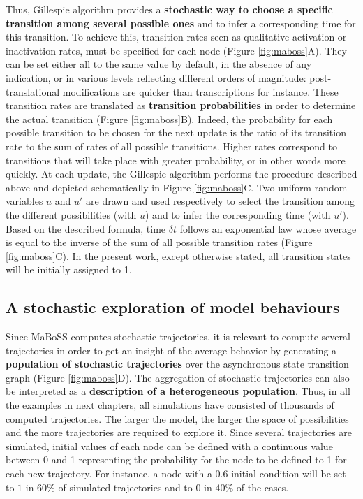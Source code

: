 \documentclass[a4paper,12pt,twoside,onecolumn,openright,final,oldfontcommands]{memoir}
\begin{document}
Thus, Gillespie algorithm provides a \textbf{stochastic way to choose a
specific transition among several possible ones} and to infer a
corresponding time for this transition. To achieve this, transition
rates seen as qualitative activation or inactivation rates, must be
specified for each node (Figure \ref{fig:maboss}A). They can be set
either all to the same value by default, in the absence of any
indication, or in various levels reflecting different orders of
magnitude: post-translational modifications are quicker than
transcriptions for instance. These transition rates are translated as
\textbf{transition probabilities} in order to determine the actual
transition (Figure \ref{fig:maboss}B). Indeed, the probability for each
possible transition to be chosen for the next update is the ratio of its
transition rate to the sum of rates of all possible transitions. Higher
rates correspond to transitions that will take place with greater
probability, or in other words more quickly. At each update, the
Gillespie algorithm performs the procedure described above and depicted
schematically in Figure \ref{fig:maboss}C. Two uniform random variables
\(u\) and \(u'\) are drawn and used respectively to select the
transition among the different possibilities (with \(u\)) and to infer
the corresponding time (with \(u'\)). Based on the described formula,
time \(\delta t\) follows an exponential law whose average is equal to
the inverse of the sum of all possible transition rates (Figure
\ref{fig:maboss}C). In the present work, except otherwise stated, all
transition states will be initially assigned to 1.

\subsection{A stochastic exploration of model
behaviours}\label{a-stochastic-exploration-of-model-behaviours}

Since MaBoSS computes stochastic trajectories, it is relevant to compute
several trajectories in order to get an insight of the average behavior
by generating a \textbf{population of stochastic trajectories} over the
asynchronous state transition graph (Figure \ref{fig:maboss}D). The
aggregation of stochastic trajectories can also be interpreted as a
\textbf{description of a heterogeneous population}. Thus, in all the
examples in next chapters, all simulations have consisted of thousands
of computed trajectories. The larger the model, the larger the space of
possibilities and the more trajectories are required to explore it.
Since several trajectories are simulated, initial values of each node
can be defined with a continuous value between 0 and 1 representing the
probability for the node to be defined to 1 for each new trajectory. For
instance, a node with a \(0.6\) initial condition will be set to \(1\)
in \(60\%\) of simulated trajectories and to \(0\) in \(40\%\) of the
cases.
\end{document}
